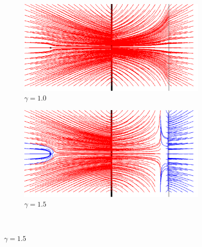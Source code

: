 \begin{appendices}
\begin{figure}[H]
   \begin{subfigure}[c]{.5\linewidth}
     \centering
     \includegraphics[scale=0.35]{Chapters/Images/m1_gamma_10.png}
     \caption{$\gamma=1.0$}
   \end{subfigure}
   \begin{subfigure}[c]{.5\linewidth}
     \centering
     \includegraphics[scale=0.35]{Chapters/Images/m1_gamma_15.png}
     \caption{$\gamma=1.5$}
   \end{subfigure}\\
   

\end{figure}
\end{appendices}
